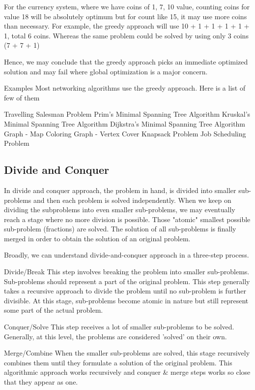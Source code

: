 For the currency system, where we have coins of 1, 7, 10 value, counting coins for value 18 will be absolutely optimum but for count like 15, it may use more coins than necessary. For example, the greedy approach will use 10 + 1 + 1 + 1 + 1 + 1, total 6 coins. Whereas the same problem could be solved by using only 3 coins (7 + 7 + 1)

Hence, we may conclude that the greedy approach picks an immediate optimized solution and may fail where global optimization is a major concern.

Examples
Most networking algorithms use the greedy approach. Here is a list of few of them

Travelling Salesman Problem
Prim's Minimal Spanning Tree Algorithm
Kruskal's Minimal Spanning Tree Algorithm
Dijkstra's Minimal Spanning Tree Algorithm
Graph - Map Coloring
Graph - Vertex Cover
Knapsack Problem
Job Scheduling Problem

\subsection{Divide and Conquer}

In divide and conquer approach, the problem in hand, is divided into smaller sub-problems and then each problem is solved independently. When we keep on dividing the subproblems into even smaller sub-problems, we may eventually reach a stage where no more division is possible. Those "atomic" smallest possible sub-problem (fractions) are solved. The solution of all sub-problems is finally merged in order to obtain the solution of an original problem.



Broadly, we can understand divide-and-conquer approach in a three-step process.

Divide/Break
This step involves breaking the problem into smaller sub-problems. Sub-problems should represent a part of the original problem. This step generally takes a recursive approach to divide the problem until no sub-problem is further divisible. At this stage, sub-problems become atomic in nature but still represent some part of the actual problem.

Conquer/Solve
This step receives a lot of smaller sub-problems to be solved. Generally, at this level, the problems are considered 'solved' on their own.

Merge/Combine
When the smaller sub-problems are solved, this stage recursively combines them until they formulate a solution of the original problem. This algorithmic approach works recursively and conquer & merge steps works so close that they appear as one.

